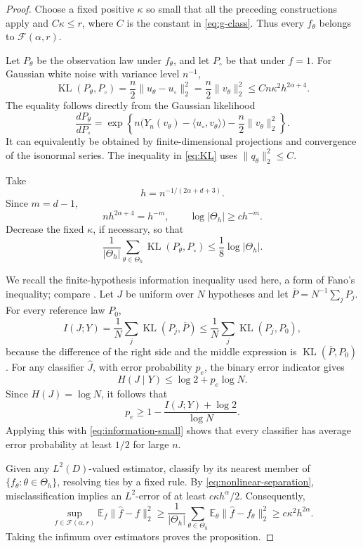 \documentclass[11pt]{article}
\theoremstyle{remark}
\newcommand{\E}{\mathbb E}
\newcommand{\cF}{\mathcal F}
\DeclareMathOperator{\KL}{KL}
\begin{document}
\begin{proof}
Choose a fixed positive \(\kappa\) so small that all the preceding
constructions apply and \(C\kappa\leq r\), where \(C\) is the constant
in \eqref{eq:g-class}. Thus every \(f_\theta\) belongs to
\(\cF(\alpha,r)\).

Let \(P_\theta\) be the observation law under \(f_\theta\), and let
\(P_\circ\) be that under \(f=1\).
For Gaussian white noise with variance level \(n^{-1}\),
\begin{equation}\label{eq:KL}
\KL(P_\theta,P_\circ)
=\frac n2\|u_\theta-u_\circ\|_2^2
=\frac n2\|v_\theta\|_2^2
\leq Cn\kappa^2h^{2\alpha+4}.
\end{equation}
The equality follows directly from the Gaussian likelihood
\[
\frac{dP_\theta}{dP_\circ}
=
\exp\left\{
n\big(Y_n(v_\theta)-\langle u_\circ,v_\theta\rangle\big)
-\frac n2\|v_\theta\|_2^2
\right\}.
\]
It can equivalently be obtained by finite-dimensional projections
and convergence of the isonormal series. The inequality in
\eqref{eq:KL} uses \(\|q_\theta\|_2^2\leq C\).

Take
\[
h=n^{-1/(2\alpha+d+3)}.
\]
Since \(m=d-1\),
\[
nh^{2\alpha+4}=h^{-m},
\qquad
\log|\Theta_h|\geq c h^{-m}.
\]
Decrease the fixed \(\kappa\), if necessary, so that
\begin{equation}\label{eq:information-small}
\frac1{|\Theta_h|}
\sum_{\theta\in\Theta_h}\KL(P_\theta,P_\circ)
\leq\frac18\log|\Theta_h|.
\end{equation}

We recall the finite-hypothesis information inequality used here,
a form of Fano's inequality; compare
\cite[Theorem~2.5 and Chapter~2]{Tsybakov}.
Let \(J\) be uniform over \(N\) hypotheses and let
\(\overline P=N^{-1}\sum_jP_j\).
For every reference law \(P_0\),
\[
I(J;Y)
=\frac1N\sum_j\KL(P_j,\overline P)
\leq\frac1N\sum_j\KL(P_j,P_0),
\]
because the difference of the right side and the middle expression
is \(\KL(\overline P,P_0)\).
For any classifier \(\widehat J\), with error probability \(p_e\),
the binary error indicator gives
\[
H(J\mid Y)\leq\log2+p_e\log N.
\]
Since \(H(J)=\log N\), it follows that
\[
p_e\geq1-\frac{I(J;Y)+\log2}{\log N}.
\]
Applying this with \eqref{eq:information-small} shows that every
classifier has average error probability at least \(1/2\) for
large \(n\).

Given any \(L^2(D)\)-valued estimator, classify by its nearest member
of \(\{f_\theta:\theta\in\Theta_h\}\), resolving ties by a fixed rule.
By \eqref{eq:nonlinear-separation}, misclassification implies an
\(L^2\)-error of at least \(c\kappa h^\alpha/2\).
Consequently,
\[
\sup_{f\in\cF(\alpha,r)}
\E_f\|\widehat f-f\|_2^2
\geq
\frac1{|\Theta_h|}
\sum_{\theta\in\Theta_h}
\E_\theta\|\widehat f-f_\theta\|_2^2
\geq c\kappa^2h^{2\alpha}.
\]
Taking the infimum over estimators proves the proposition.
\end{proof}
\end{document}
